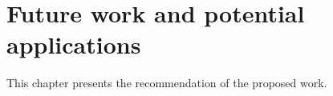 \chapter{Future work and potential applications}
\label{c-recommendation}
This chapter presents the recommendation of the proposed work.